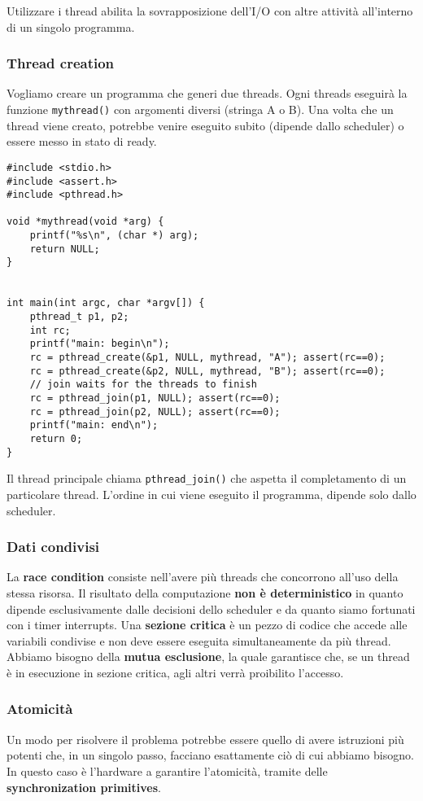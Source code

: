 \documentclass[12pt, letterpaper]{article}
\begin{document}
			Utilizzare i thread abilita la sovrapposizione dell'I/O con altre attività all'interno di un singolo programma.
			
			\subsubsection{Thread creation}
				Vogliamo creare un programma che generi due threads. Ogni threads eseguirà la funzione \texttt{mythread()} con argomenti diversi (stringa A o B). Una volta che un thread viene creato, potrebbe venire eseguito subito (dipende dallo scheduler) o essere messo in stato di ready. 
				\begin{lstlisting}[style=CStyle]
#include <stdio.h>
#include <assert.h>
#include <pthread.h>

void *mythread(void *arg) {
	printf("%s\n", (char *) arg);
	return NULL;
}


int main(int argc, char *argv[]) {
	pthread_t p1, p2;
	int rc;
	printf("main: begin\n");
	rc = pthread_create(&p1, NULL, mythread, "A"); assert(rc==0);
	rc = pthread_create(&p2, NULL, mythread, "B"); assert(rc==0);
	// join waits for the threads to finish
	rc = pthread_join(p1, NULL); assert(rc==0);
	rc = pthread_join(p2, NULL); assert(rc==0);
	printf("main: end\n");
	return 0;
} 				\end{lstlisting}
				Il thread principale chiama \texttt{pthread\_join()} che aspetta il completamento di un particolare thread. L'ordine in cui viene eseguito il programma, dipende solo dallo scheduler.
			
			\subsubsection{Dati condivisi}
				La \textbf{race condition} consiste nell'avere più threads che concorrono all'uso della stessa risorsa. Il risultato della computazione \textbf{non è deterministico} in quanto dipende esclusivamente dalle decisioni dello scheduler e da quanto siamo fortunati con i timer interrupts. Una \textbf{sezione critica} è un pezzo di codice che accede alle variabili condivise e non deve essere eseguita simultaneamente da più thread. Abbiamo bisogno della \textbf{mutua esclusione}, la quale garantisce che, se un thread è in esecuzione in sezione critica, agli altri verrà proibilito l'accesso.
				
			\subsubsection{Atomicità}
				Un modo per risolvere il problema potrebbe essere quello di avere istruzioni più potenti che, in un singolo passo, facciano esattamente ciò di cui abbiamo bisogno. In questo caso è l'hardware a garantire l'atomicità, tramite delle \textbf{synchronization primitives}.
				
\end{document}
